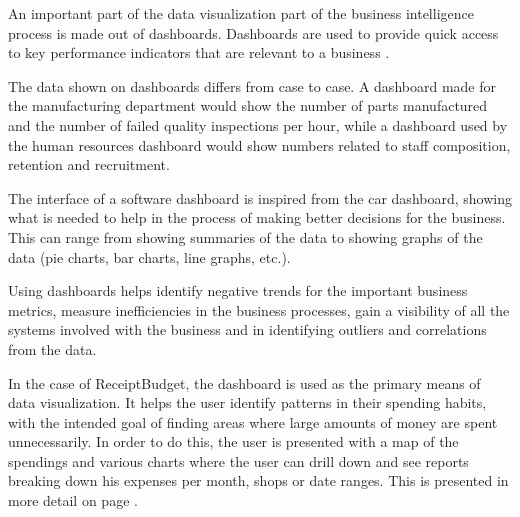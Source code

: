 An important part of the data visualization part of the business intelligence process is made out of dashboards. Dashboards are used to provide quick access to key performance indicators that are relevant to a business \cite{alexander2013excel}. 

The data shown on dashboards differs from case to case. A dashboard made for the manufacturing department would show the number of parts manufactured and the number of failed quality inspections per hour, while a dashboard used by the human resources dashboard would show numbers related to staff composition, retention and recruitment. 

The interface of a software dashboard is inspired from the car dashboard, showing what is needed to help in the process of making better decisions for the business. This can range from showing summaries of the data to showing graphs of the data (pie charts, bar charts, line graphs, etc.).

Using dashboards helps identify negative trends for the important business metrics, measure inefficiencies in the business processes, gain a visibility of all the systems involved with the business and in identifying outliers and correlations from the data. 

In the case of ReceiptBudget, the dashboard is used as the primary means of data visualization. It helps the user identify patterns in their spending habits, with the intended goal of finding areas where large amounts of money are spent unnecessarily. In order to do this, the user is presented with a map of the spendings and various charts where the user can drill down and see reports breaking down his expenses per month, shops or date ranges. This is presented in more detail on page \pageref{sec:manual}.